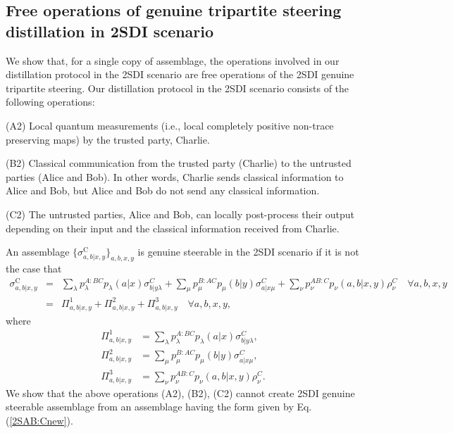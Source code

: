 \documentclass[reprint,superscriptaddress,nofootinbib,amsmath,amssymb,aps,pra,longbibliography]{revtex4-1}
\begin{document}
\begin{widetext}
 
 
  
 \section{Free operations of genuine tripartite steering distillation in 2SDI scenario}\label{app2}
 
 We  show that, for a single copy of assemblage, the operations involved in our distillation protocol in the 2SDI scenario are free operations of the 2SDI genuine tripartite steering. Our distillation protocol in the 2SDI scenario consists of the following operations:
 
 (A2) Local quantum measurements (i.e., local completely positive non-trace preserving maps) by the trusted party, Charlie.
 
 (B2) Classical communication from the trusted party (Charlie) to the untrusted  parties (Alice and Bob). In other words, Charlie sends classical information to Alice and Bob, but Alice and Bob do not send any classical information.
 
 (C2) The untrusted parties, Alice and Bob, can locally post-process their output depending on their input and the classical information received from Charlie.
 
  An assemblage $\{ \sigma^{\text{C}}_{a,b|x,y} \}_{a,b,x,y}$ is genuine steerable in the 2SDI scenario if it is not the case that \cite{Cavalcanti15}
 \begin{eqnarray} 
	\sigma^{\text{C}}_{a,b|x,y} &=& \sum_\lambda p_\lambda^{A:BC}p_\lambda(a|x)\sigma_{b|y\lambda}^{C}
	+ \sum_\mu p_\mu^{B:AC}p_\mu(b|y) \sigma_{a|x\mu}^{C}
	+ \sum_\nu p_\nu^{AB:C}  p_{\nu}(a,b|x,y) \rho_\nu^C  \quad \forall a,b,x,y \nonumber \\
&=& \Pi^1_{a,b|x,y} + \Pi^2_{a,b|x,y} + \Pi^3_{a,b|x,y} \quad \forall a, b,x,y,
						 \label{2SAB:Cnew} 
\end{eqnarray} 
where
\begin{align}
 \Pi^1_{a,b|x,y} &=  \sum_\lambda p_\lambda^{A:BC}p_\lambda(a|x)\sigma_{b|y\lambda}^{C},\nonumber \\  
 \Pi^2_{a,b|x,y} &=  \sum_\mu p_\mu^{B:AC}p_\mu(b|y) \sigma_{a|x\mu}^{C}, \nonumber \\  
 \Pi^3_{a,b|x,y} &=  \sum_\nu p_\nu^{AB:C} p_{\nu}(a,b|x,y) \rho_\nu^C . \nonumber 						        
\end{align}
We show that the above operations (A2), (B2), (C2) cannot create 2SDI genuine steerable assemblage from an assemblage having the form given by Eq.(\ref{2SAB:Cnew}). 


\end{widetext}
\end{document}
